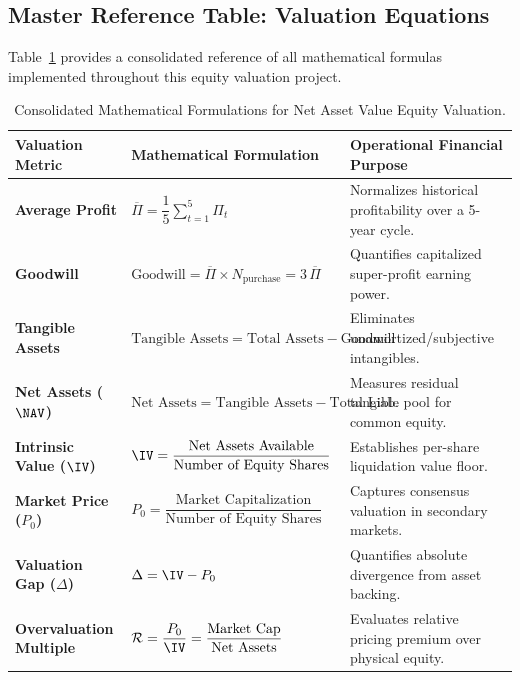 \subsection{Master Reference Table: Valuation Equations}
Table~\ref{tab:formula_summary} provides a consolidated reference of all mathematical formulas implemented throughout this equity valuation project.

\begin{table}[H]
\centering
\small
\renewcommand{\arraystretch}{1.18}
\begin{tabularx}{\textwidth}{l p{5.5cm} X}
\toprule
\textbf{Valuation Metric} & \textbf{Mathematical Formulation} & \textbf{Operational Financial Purpose} \\
\midrule
\textbf{Average Profit} & $\overline{\Pi} = \dfrac{1}{5}\sum_{t=1}^{5} \Pi_t$ & Normalizes historical profitability over a 5-year cycle. \\
\textbf{Goodwill} & $\text{Goodwill} = \overline{\Pi} \times N_{\text{purchase}} = 3\,\overline{\Pi}$ & Quantifies capitalized super-profit earning power. \\
\textbf{Tangible Assets} & $\text{Tangible Assets} = \text{Total Assets} - \text{Goodwill}$ & Eliminates unamortized/subjective intangibles. \\
\textbf{Net Assets ($\NAV$)} & $\text{Net Assets} = \text{Tangible Assets} - \text{Total Liab.}$ & Measures residual tangible pool for common equity. \\
\textbf{Intrinsic Value ($\IV$)} & $\IV = \dfrac{\text{Net Assets Available}}{\text{Number of Equity Shares}}$ & Establishes per-share liquidation value floor. \\
\textbf{Market Price ($P_0$)} & $P_0 = \dfrac{\text{Market Capitalization}}{\text{Number of Equity Shares}}$ & Captures consensus valuation in secondary markets. \\
\textbf{Valuation Gap ($\Delta$)} & $\Delta = \IV - P_0$ & Quantifies absolute divergence from asset backing. \\
\textbf{Overvaluation Multiple} & $\mathcal{R} = \dfrac{P_0}{\IV} = \dfrac{\text{Market Cap}}{\text{Net Assets}}$ & Evaluates relative pricing premium over physical equity. \\
\bottomrule
\end{tabularx}
\caption{Consolidated Mathematical Formulations for Net Asset Value Equity Valuation.}
\label{tab:formula_summary}
\end{table}
